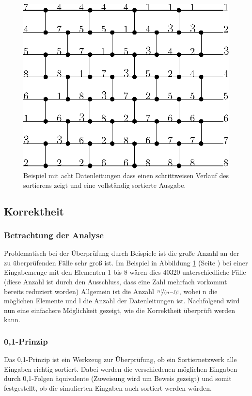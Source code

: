 \documentclass[11pt]{article}
\begin{document}
\begin{figure}
\begin{center}
\includegraphics[scale=1]{bild2beispiel.eps}
\caption{Beispiel mit acht Datenleitungen dass einen schrittweisen Verlauf des sortierens zeigt und eine vollständig sortierte Ausgabe.}
\label{fig:kompnetnumbex}
\end{center}
\end{figure}
\FloatBarrier
\subsection{Korrektheit}
\subsubsection{Betrachtung der Analyse}
Problematisch bei der Überprüfung durch Beispiele ist die große Anzahl an der zu überprüfenden Fälle sehr groß ist. Im Beispiel in Abbildung \ref{fig:kompnetnumbex} (Seite \pageref{fig:kompnetnumbex}) bei einer Eingabemenge mit den Elementen 1 bis 8 wären dies 40320 unterschiedliche Fälle (diese Anzahl ist durch den Ausschluss, dass eine Zahl mehrfach vorkommt bereits reduziert worden) Allgemein ist die Anzahl $\nicefrac{n!}{(n-l)!}$, wobei n die möglichen Elemente und l die Anzahl der Datenleitungen ist. Nachfolgend wird nun eine einfachere Möglichkeit gezeigt, wie die Korrektheit überprüft werden kann.
\subsubsection{0,1-Prinzip}
Das 0,1-Prinzip ist ein Werkzeug zur Überprüfung, ob ein Sortiernetzwerk alle Eingaben richtig sortiert. Dabei werden die verschiedenen möglichen Eingaben durch 0,1-Folgen äquivalente (Zuweisung wird um Beweis gezeigt) und somit festgestellt, ob die simulierten Eingaben auch sortiert werden würden. 
\end{document}
